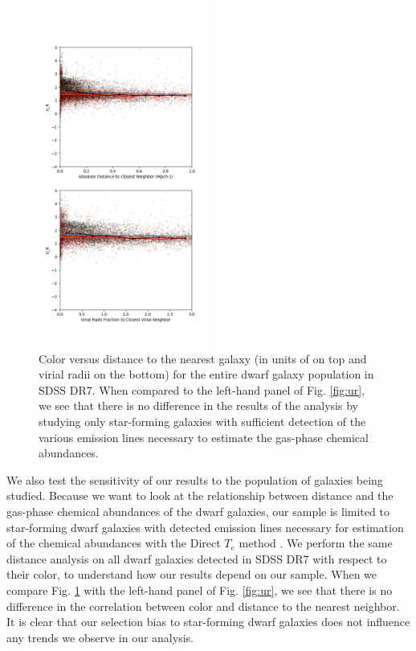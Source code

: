 \begin{figure}
    \includegraphics[width=0.5\textwidth]{Images/smallScaleEnvironment/ALLdwarf_ur_300}
    \caption[Color versus distance of full SDSS dwarf population]{Color versus 
    distance to the nearest galaxy (in units of \hMpc on top and virial radii on 
    the bottom) for the entire dwarf galaxy population in SDSS DR7.  When 
    compared to the left-hand panel of Fig. \ref{fig:ur}, we see that there is 
    no difference in the results of the analysis by studying only star-forming 
    galaxies with sufficient detection of the various emission lines necessary 
    to estimate the gas-phase chemical abundances.}
    \label{fig:ur_allDwarf}
\end{figure}

We also test the sensitivity of our results to the population of galaxies being 
studied.  Because we want to look at the relationship between distance and the 
gas-phase chemical abundances of the dwarf galaxies, our sample is limited to 
star-forming dwarf galaxies with detected emission lines necessary for 
estimation of the chemical abundances with the Direct $T_e$ method 
\citep[see][for more details]{Douglass17a}.  We perform the same distance 
analysis on all dwarf galaxies detected in SDSS DR7 with respect to their 
color, to understand how our results depend on our sample.  When we compare Fig. 
\ref{fig:ur_allDwarf} with the left-hand panel of Fig. \ref{fig:ur}, we see that 
there is no difference in the correlation between color and distance to the 
nearest neighbor.  It is clear that our selection bias to star-forming dwarf 
galaxies does not influence any trends we observe in our analysis.


